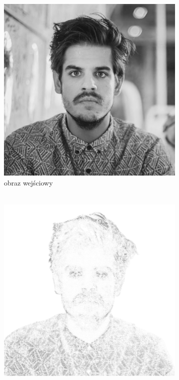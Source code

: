     \begin{figure}[htb] 
    \centering
    \begin{subfigure}{0.32\textwidth}
        \centering
        \includegraphics[width = \textwidth]{img/4-mine/taco-mask/taco-grey.png}
        \caption{obraz wejściowy\\\hphantom{ }\\\hphantom{ }}
        \label{mine-param-taco-a}
    \end{subfigure}
    \begin{subfigure}{0.32\textwidth}
        \centering
        \includegraphics[width = \textwidth]{img/4-mine/taco-mask/taco_mask_c20_inv0_bg1_obj1_ed1.png}

\end{subfigure}
\end{figure}
